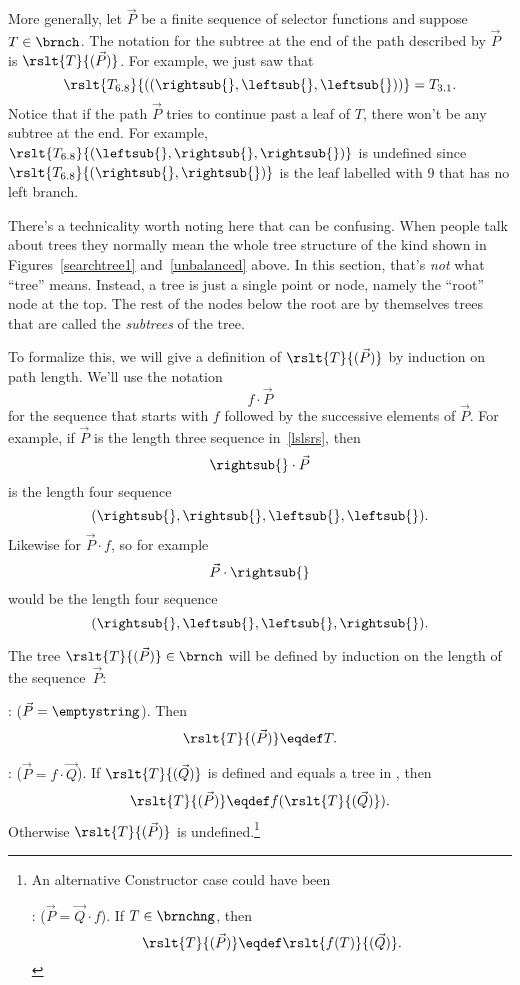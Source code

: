 \begin{definition}
More generally, let $\vec{P}$ be a finite sequence of selector
functions and suppose $T \in \brnch$.  The notation for the subtree at
the end of the path described by $\vec{P}$ is $\rslt{T}{(\vec{P})}$.
For example, we just saw that
\[
\rslt{T_{6.8}}{((\rightsub{},\leftsub{},\leftsub{}))} = T_{3.1}.
\]
Notice that if the path $\vec{P}$ tries to continue past a leaf of
$T$, there won't be any subtree at the end.  For example,
$\rslt{T_{6.8}}{(\leftsub{},\rightsub{},\rightsub{})}$ is undefined
since $\rslt{T_{6.8}}{(\rightsub{},\rightsub{})}$ is the leaf labelled
with 9 that has no left branch.

There's a technicality worth noting here that can be confusing.  When
people talk about trees they normally mean the whole tree structure of
the kind shown in Figures~\ref{searchtree1} and~\ref{unbalanced}
above.  In this section, that's \emph{not} what ``tree'' means.  Instead, a
tree is just a single point or node, namely the ``root'' node at the
top.  The rest of the nodes below the root are by themselves trees
that are called the \emph{subtrees} of the tree.

To formalize this, we will give a definition of $\rslt{T}{(\vec{P})}$
by induction on path length.  We'll use the notation
\[
f \cdot \vec{P}
\]
for the sequence that starts with $f$ followed by the successive
elements of $\vec{P}$.  For example, if $\vec{P}$ is the length three
sequence in~\eqref{lslsrs}, then
\[
\rightsub{} \cdot \vec{P}
\]
is the length four sequence
\[
(\rightsub{},\rightsub{}, \leftsub{},\leftsub{}).
\]
Likewise for $\vec{P} \cdot f$, so for example
\[
 \vec{P} \cdot \rightsub{}
\]
would be the length four sequence
\[
(\rightsub{},\leftsub{},\leftsub{},\rightsub{}).
\]

\begin{definition}
The tree $\rslt{T}{(\vec{P})} \in \brnch$ will be defined by induction
on the length of the sequence~$\vec{P}$:

: ($\vec{P} = \emptystring$).
Then
\[
\rslt{T}{(\vec{P})} \eqdef T.
\]

: ($\vec{P} = f \cdot \vec{Q}$).  If
$\rslt{T}{(\vec{Q})}$ is defined and equals a tree in \brnchng, then
\[
\rslt{T}{(\vec{P})} \eqdef f(\rslt{T}{(\vec{Q})}).
\]
Otherwise $\rslt{T}{(\vec{P})}$ is undefined.\footnote{An alternative
  Constructor case could have been

: ($\vec{P} = \vec{Q} \cdot f$).  If
$T \in \brnchng$, then
\[
\rslt{T}{(\vec{P})} \eqdef \rslt{f(T)}{(\vec{Q})}.
\]}


\end{definition}
\end{definition}
